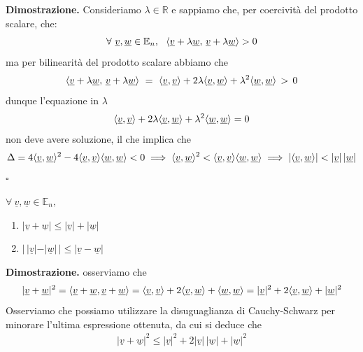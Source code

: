 %
\noindent \textbf{Dimostrazione. }
Consideriamo $\lambda \in \mathbb{R}$ e sappiamo che, per coercività del prodotto scalare, che:
%
\[\forall\ \underline{v}, \underline{w} \in \mathbb{E}_n, \ \ \langle \underline{v} + \lambda \underline{w}, \, \underline{v} + \lambda \underline{w} \rangle > 0\]
%
ma per bilinearità del prodotto scalare abbiamo che
%
\[\innerprod {\underline{v} + \lambda \underline{w}} {\, \underline{v} + \lambda \underline{w}}\ =\ \innerprod{\underline{v}}{\underline{v}} + 2\lambda \innerprod{\underline{v}} {\underline{w}} + \lambda^2 \innerprod{\underline{w}}{\underline{w}}\,>\, 0\]
%
dunque l'equazione in $\lambda$
%
\[\langle \underline{v}, \underline{v} \rangle + 2\lambda \langle \underline{v}, \underline{w} \rangle + \lambda^2 \langle \underline{w}, \underline{w} \rangle = 0\]
%
non deve avere soluzione, il che implica che
%
\[\Delta = 4\langle \underline{v}, \underline{w} \rangle^2 - 4 \langle \underline{v}, \underline{v} \rangle \langle \underline{w}, \underline{w} \rangle < 0 \implies \langle \underline{v}, \underline{w} \rangle^2 < \langle \underline{v}, \underline{v} \rangle \langle \underline{w}, \underline{w} \rangle \implies |\langle \underline{v}, \underline{w} \rangle| < |\underline{v}| \, |\underline{w}|\]
\hfill $\square$
%
\vspace{0.5cm}
\begin{prop}[\textcolor{blue}{Disuguaglianza triangolare}] $\forall\ \underline{v}, \underline{w} \in \mathbb{E}_n, $
%
\begin{enumerate}[label=\protect\circled{\arabic*}]
	\item $|\underline{v} + \underline{w}| \leq |\underline{v}| + |\underline{w}|$
	\item $| \, |\underline{v}| - |\underline{w}| \, | \leq |\underline{v} - \underline{w}|$
\end{enumerate}
\label{prop:dis_triang}
\end{prop}
%
\noindent \textbf{Dimostrazione. }
osserviamo che
\begin{align*}
|\underline{v} + \underline{w}|^2 = \langle \underline{v} + \underline{w}, \underline{v} + \underline{w} \rangle = \langle \underline{v}, \underline{v} \rangle + 2\langle \underline{v}, \underline{w} \rangle + \langle \underline{w}, \underline{w} \rangle = |\underline{v}|^2 + 2 \langle \underline{v}, \underline{w} \rangle + |\underline{w}|^2
\end{align*}
%
Osserviamo che possiamo utilizzare la disuguaglianza di Cauchy-Schwarz per minorare l'ultima espressione ottenuta, da cui si deduce che
%
\begin{align*}
|\underline{v} + \underline{w}|^2 \leq |\underline{v}|^2 + 2|\underline{v}| \, |\underline{w}| + |\underline{w}|^2
\end{align*}
